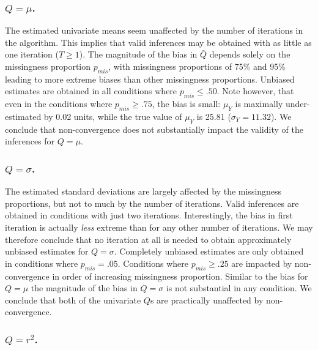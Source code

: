 \documentclass[Royal,times,sageh]{sagej}
\begin{document}
\hypertarget{qmu.}{%
\subsubsection{\texorpdfstring{\(Q=\mu\).}{Q=\textbackslash mu.}}\label{qmu.}}

The estimated univariate means seem unaffected by the number of iterations in the algorithm. This implies that valid inferences may be obtained with as little as one iteration (\(T \geq 1\)). The magnitude of the bias in \(\bar{Q}\) depends solely on the missingness proportion \(p_{mis}\), with missingness proportions of 75\% and 95\% leading to more extreme biases than other missingness proportions. Unbiased estimates are obtained in all conditions where \(p_{mis}\leq.50\). Note however, that even in the conditions where \(p_{mis}\geq.75\), the bias is small: \(\mu_Y\) is maximally under-estimated by 0.02 units, while the true value of \(\mu_Y\) is 25.81 (\(\sigma_Y = 11.32\)). We conclude that non-convergence does not substantially impact the validity of the inferences for \(Q=\mu\).

\hypertarget{qsigma.}{%
\subsubsection{\texorpdfstring{\(Q=\sigma\).}{Q=\textbackslash sigma.}}\label{qsigma.}}

The estimated standard deviations are largely affected by the missingness proportions, but not to much by the number of iterations. Valid inferences are obtained in conditions with just two iterations. Interestingly, the bias in first iteration is actually \emph{less} extreme than for any other number of iterations. We may therefore conclude that no iteration at all is needed to obtain approximately unbiased estimates for \(Q=\sigma\). Completely unbiased estimates are only obtained in conditions where \(p_{mis}=.05\). Conditions where \(p_{mis}\geq.25\) are impacted by non-convergence in order of increasing missingness proportion. Similar to the bias for \(Q=\mu\) the magnitude of the bias in \(Q=\sigma\) is not substantial in any condition. We conclude that both of the univariate \(Q\)s are practically unaffected by non-convergence.

\hypertarget{qr2.}{%
\subsubsection{\texorpdfstring{\(Q=r^2\).}{Q=r\^{}2.}}\label{qr2.}}
\end{document}
